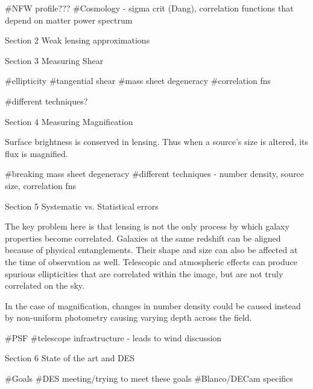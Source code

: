 #NFW profile???
#Cosmology - sigma crit (Dang), correlation functions that depend on matter power spectrum


Section 2
Weak lensing approximations


Section 3
Measuring Shear

#ellipticity
#tangential shear
#mass sheet degeneracy
#correlation fns

#different techniques? 

Section 4
Measuring Magnification

Surface brightness is conserved in lensing. Thus when a source's size is altered, its flux is magnified.

#breaking mass sheet degeneracy
#different techniques - number density, source size, correlation fns

Section 5
Systematic vs. Statistical errors

The key problem here is that lensing is not the only process by which galaxy properties become correlated. Galaxies at the same redshift can be aligned because of physical entanglements. Their shape and size can also be affected at the time of observation as well. Telescopic and atmospheric effects can produce spurious ellipticities that are correlated within the image, but are not truly correlated on the sky.

In the case of magnification, changes in number density could be caused instead by non-uniform photometry causing varying depth across the field. 

#PSF
#telescope infrastructure - leads to wind discussion


Section 6
State of the art and DES

#Goals
#DES meeting/trying to meet these goals
#Blanco/DECam specifics
